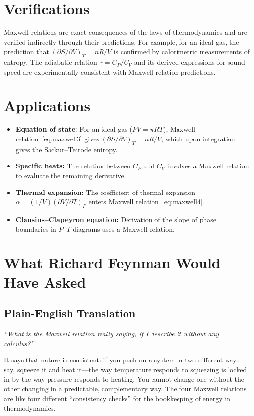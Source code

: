 \section*{Verifications}

Maxwell relations are exact consequences of the laws of thermodynamics and are verified indirectly through their predictions. For example, for an ideal gas, the prediction that $(\partial S/\partial V)_{T} = nR/V$ is confirmed by calorimetric measurements of entropy. The adiabatic relation $\gamma = C_{P}/C_{V}$ and its derived expressions for sound speed are experimentally consistent with Maxwell relation predictions.
\section*{Applications}

\begin{itemize}
  \item \textbf{Equation of state:} For an ideal gas ($PV = nRT$), Maxwell relation~\eqref{eq:maxwell3} gives $(\partial S/\partial V)_{T} = nR/V$, which upon integration gives the Sackur--Tetrode entropy.
  \item \textbf{Specific heats:} The relation between $C_{P}$ and $C_{V}$ involves a Maxwell relation to evaluate the remaining derivative.
  \item \textbf{Thermal expansion:} The coefficient of thermal expansion $\alpha = (1/V)(\partial V/\partial T)_{P}$ enters Maxwell relation~\eqref{eq:maxwell4}.
  \item \textbf{Clausius--Clapeyron equation:} Derivation of the slope of phase boundaries in $P$--$T$ diagrams uses a Maxwell relation.
\end{itemize}
\section*{What Richard Feynman Would Have Asked}

\subsection*{Plain-English Translation}
\textit{``What is the Maxwell relation really saying, if I describe it without any calculus?''}

It says that nature is consistent: if you push on a system in two different ways---say, squeeze it and heat it---the way temperature responds to squeezing is locked in by the way pressure responds to heating. You cannot change one without the other changing in a predictable, complementary way. The four Maxwell relations are like four different ``consistency checks'' for the bookkeeping of energy in thermodynamics.


